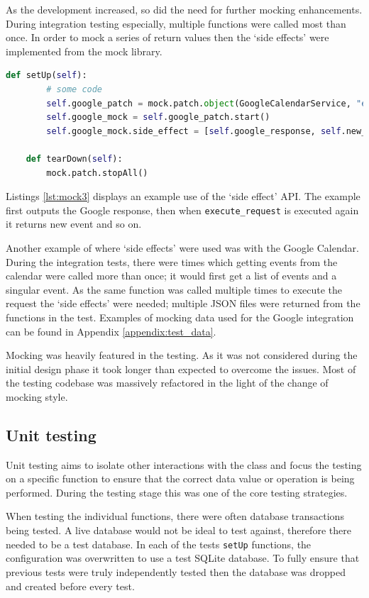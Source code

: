 As the development increased, so did the need for further mocking enhancements. During integration testing especially, multiple functions were called most than once. In order to mock a series of return values then the `side effects' were implemented from the mock library.

\begin{lstlisting}[language=python, label={lst:mock3}, breaklines, columns=fullflexible, keywordstyle=\color{blue}, basicstyle=\normalsize\ttfamily]
    def setUp(self):
        # some code
        self.google_patch = mock.patch.object(GoogleCalendarService, "execute_request")
        self.google_mock = self.google_patch.start()
        self.google_mock.side_effect = [self.google_response, self.new_event, self.google_response, self.updated_response]

    def tearDown(self):
        mock.patch.stopAll()
\end{lstlisting}

Listings \ref{lst:mock3} displays an example use of the `side effect' API. The example first outputs the Google response, then when \texttt{execute\_request} is executed again it returns new event and so on.

Another example of where `side effects' were used was with the Google Calendar. During the integration tests, there were times which getting events from the calendar were called more than once; it would first get a list of events and a singular event. As the same function was called multiple times to execute the request the `side effects' were needed; multiple JSON files were returned from the functions in the test. Examples of mocking data used for the Google integration can be found in Appendix \ref{appendix:test_data}.

Mocking was heavily featured in the testing. As it was not considered during the initial design phase it took longer than expected to overcome the issues. Most of the testing codebase was massively refactored in the light of the change of mocking style.

\subsection{Unit testing}
Unit testing aims to isolate other interactions with the class and focus the testing on a specific function to ensure that the correct data value or operation is being performed. During the testing stage this was one of the core testing strategies.

When testing the individual functions, there were often database transactions being tested. A live database would not be ideal to test against, therefore there needed to be a test database. In each of the tests \texttt{setUp} functions, the configuration was overwritten to use a test SQLite database. To fully ensure that previous tests were truly independently tested then the database was dropped and created before every test.

